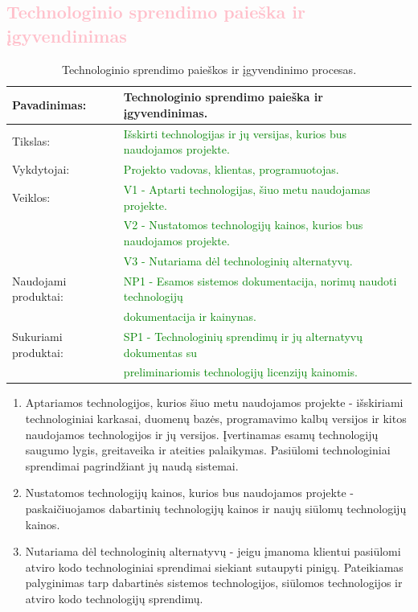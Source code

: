 \documentclass{VUMIFPSkursinis}
\begin{document}
	\subsection{\textcolor{pink}{Technologinio sprendimo paieška ir įgyvendinimas}}
	\begin{center}
		\begin{table}[ht]
			\caption{Technologinio sprendimo paieškos ir įgyvendinimo procesas.}
			\begin{tabular}{ | l | l | }
				\hline
				Pavadinimas:		& Technologinio sprendimo paieška ir įgyvendinimas.									\\ \hline
				Tikslas:		& \textcolor{green}{Išskirti technologijas ir jų versijas, kurios bus naudojamos projekte. 	}					\\ \hline
				Vykdytojai:		& \textcolor{green}{Projekto vadovas, klientas, programuotojas.}										\\ \hline
				Veiklos:		&\textcolor{green}{V1 - Aptarti technologijas, šiuo metu naudojamas projekte.} 								\\
							& \textcolor{green}{V2 - Nustatomos technologijų kainos, kurios bus naudojamos projekte.}							\\
							& \textcolor{green}{V3 - Nutariama dėl technologinių alternatyvų.	}									\\ \hline
				Naudojami produktai:	& \textcolor{green}{NP1 - Esamos sistemos dokumentacija, norimų naudoti technologijų} \\& \textcolor{green}{dokumentacija ir kainynas. 	}		\\ \hline
				Sukuriami produktai:	& \textcolor{green}{SP1 - Technologinių sprendimų ir jų alternatyvų dokumentas su} \\& \textcolor{green}{preliminariomis technologijų licenzijų kainomis.}	\\ \hline
			\end{tabular}
		\end{table}
	\end{center}
	\newpage
	\begin{enumerate}
		\item{
			Aptariamos technologijos, kurios šiuo metu naudojamos projekte - išskiriami technologiniai karkasai, duomenų bazės, programavimo kalbų versijos ir kitos naudojamos technologijos ir jų versijos.
			Įvertinamas esamų technologijų saugumo lygis, greitaveika ir ateities palaikymas.
			Pasiūlomi technologiniai sprendimai pagrindžiant jų naudą sistemai.
		}
		\item{Nustatomos technologijų kainos, kurios bus naudojamos projekte - paskaičiuojamos dabartinių technologijų kainos ir naujų siūlomų technologijų kainos.}
		\item{
			Nutariama dėl technologinių alternatyvų - jeigu įmanoma klientui pasiūlomi atviro kodo technologiniai sprendimai siekiant sutaupyti pinigų.
			Pateikiamas palyginimas tarp dabartinės sistemos technologijos, siūlomos technologijos ir atviro kodo technologijų sprendimų.
		}
	\end{enumerate}
\end{document}
